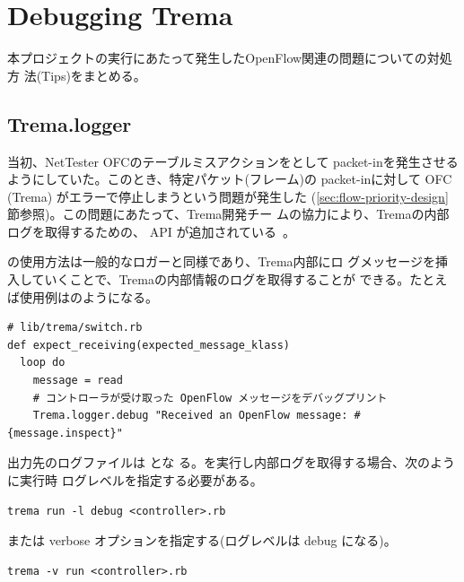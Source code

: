  \section{Debugging Trema}
 \label{sec:debugging-trema}

本プロジェクトの実行にあたって発生したOpenFlow関連の問題についての対処方
法(Tips)をまとめる。

  \subsection{Trema.logger}
  \label{sec:trema-logger}

当初、NetTester OFCのテーブルミスアクションをとして
packet-inを発生させるようにしていた。このとき、特定パケット(フレーム)の
packet-inに対して OFC (Trema) がエラーで停止しまうという問題が発生した
(\ref{sec:flow-priority-design}節参照)。この問題にあたって、Trema開発チー
ムの協力により、Tremaの内部ログを取得するための、 API
が追加されている~\cite{trema-logger-doc}。

の使用方法は一般的なロガーと同様であり、Trema内部にロ
グメッセージを挿入していくことで、Tremaの内部情報のログを取得することが
できる。たとえば使用例はのようになる。
\begin{lstlisting}[caption=\code{Trema.logger}使用例,label=lst:trema-logger-example]
# lib/trema/switch.rb
def expect_receiving(expected_message_klass)
  loop do
    message = read
    # コントローラが受け取った OpenFlow メッセージをデバッグプリント
    Trema.logger.debug "Received an OpenFlow message: #{message.inspect}"
\end{lstlisting}

出力先のログファイルは  とな
る。を実行し内部ログを取得する場合、次のように実行時
ログレベルを指定する必要がある。
\begin{lstlisting}
trema run -l debug <controller>.rb
\end{lstlisting}
または verbose オプションを指定する(ログレベルは debug になる)。
\begin{lstlisting}
trema -v run <controller>.rb
\end{lstlisting}

